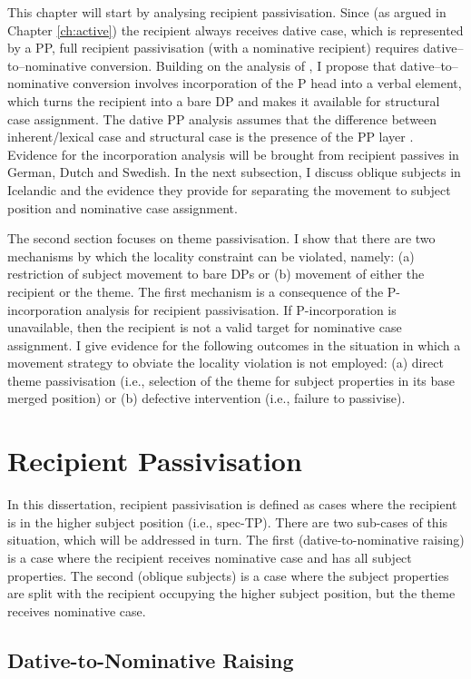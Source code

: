 This chapter will start by analysing recipient passivisation. Since (as argued in Chapter \ref{ch:active}) the recipient always receives dative case, which is represented by a PP, full recipient passivisation (with a nominative recipient) requires dative--to--nominative conversion. Building on the analysis of \cite{Alexiadou.2014}, I propose that dative--to--nominative conversion involves incorporation of the P head into a verbal element, which turns the recipient into a bare DP and makes it available for structural case assignment. The dative PP analysis assumes that the difference between inherent/lexical case and structural case is the presence of the PP layer \citep{Bayer.2001}. Evidence for the incorporation analysis will be brought from recipient passives in German, Dutch and Swedish. In the next subsection, I discuss oblique subjects in Icelandic and the evidence they provide for separating the movement to subject position and nominative case assignment.

The second section focuses on theme passivisation. I show that there are two mechanisms by which the locality constraint can be violated, namely: (a) restriction of subject movement to bare DPs or (b) movement of either the recipient or the theme. The first mechanism is a consequence of the P-incorporation analysis for recipient passivisation. If P-incorporation is unavailable, then the recipient is not a valid target for nominative case assignment. I give evidence for the following outcomes in the situation in which a movement strategy to obviate the locality violation is not employed: (a) direct theme passivisation (i.e., selection of the theme for subject properties in its base merged position) or (b) defective intervention (i.e., failure to passivise).

\section{Recipient Passivisation}
In this dissertation, recipient passivisation is defined as cases where the recipient is in the higher subject position (i.e., spec-TP). There are two sub-cases of this situation, which will be addressed in turn. The first (dative-to-nominative raising) is a case where the recipient receives nominative case and has all subject properties. The second (oblique subjects) is a case where the subject properties are split with the recipient occupying the higher subject position, but the theme receives nominative case.

\subsection{Dative-to-Nominative Raising}

